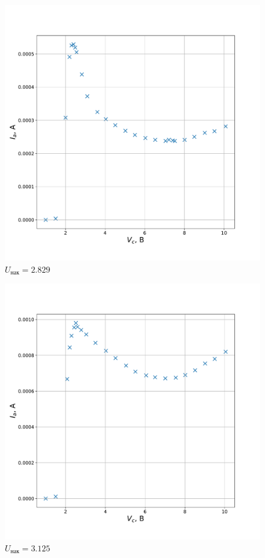 \documentclass[a4paper, 12pt]{article}
\begin{document}
\begin{figure}[!h]
    \includegraphics[scale = 0.4]{graph1}
    \centering
    \caption{$U_{нак} = 2.829$}
    \label{pic:graph1}
\end{figure}

\begin{figure}[!h]
    \includegraphics[scale = 0.36]{graph2}
    \centering
    \caption{$U_{нак} = 3.125$}
    \label{pic:graph2}
\end{figure}
\end{document}
